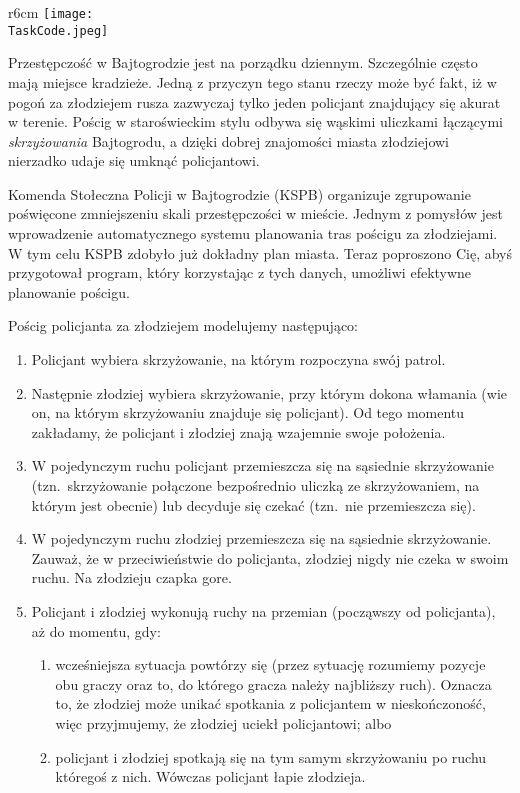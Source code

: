 \documentclass{boi2014-pl}
\renewcommand{\TaskCode}{coprobber}
\begin{document}
    \begin{wrapfigure}[8]{r}{6cm}
        \vspace{-24pt}
		\texttt{[image: \\TaskCode.jpeg]}
	\end{wrapfigure}

  \medskip
    Przestępczość w Bajtogrodzie jest na porządku dziennym.
    Szczególnie często mają miejsce kradzieże.
    Jedną z przyczyn tego stanu rzeczy może być fakt, iż w pogoń za złodziejem
    rusza zazwyczaj tylko jeden policjant znajdujący się akurat w terenie.
    Pościg w staroświeckim stylu odbywa się wąskimi uliczkami łączącymi
    \emph{skrzyżowania} Bajtogrodu, a dzięki dobrej znajomości miasta złodziejowi
    nierzadko udaje się umknąć policjantowi.

  \smallskip
    Komenda Stołeczna Policji w Bajtogrodzie (KSPB) organizuje zgrupowanie poświęcone
    zmniejszeniu skali przestępczości w mieście.
    Jednym z pomysłów jest wprowadzenie automatycznego systemu planowania tras pościgu
    za złodziejami.
    W tym celu KSPB zdobyło już dokładny plan miasta.
    Teraz poproszono Cię, abyś przygotował program, który korzystając z tych danych,
    umożliwi efektywne planowanie pościgu.

    Pościg policjanta za złodziejem modelujemy następująco:
    \begin{enumerate}
        \item Policjant wybiera skrzyżowanie, na którym rozpoczyna swój patrol.
        \item Następnie złodziej wybiera skrzyżowanie, przy którym dokona włamania
            (wie on, na którym skrzyżowaniu znajduje się policjant).
            Od tego momentu zakładamy, że policjant i złodziej znają wzajemnie
            swoje położenia.
        \item W pojedynczym ruchu policjant przemieszcza się na sąsiednie skrzyżowanie
            (tzn.\ skrzyżowanie połączone bezpośrednio uliczką ze skrzyżowaniem,
            na którym jest obecnie) lub decyduje się czekać (tzn.\ nie przemieszcza się).
        \item W pojedynczym ruchu złodziej przemieszcza się na sąsiednie skrzyżowanie.
            Zauważ, że w przeciwieństwie do policjanta, złodziej nigdy nie czeka
            w swoim ruchu.
            Na złodzieju czapka gore.
        \item Policjant i złodziej wykonują ruchy na przemian (począwszy od policjanta),
            aż do momentu, gdy:
        \begin{enumerate}
            \item wcześniejsza sytuacja powtórzy się (przez sytuację rozumiemy pozycje
                obu graczy oraz to, do którego gracza należy najbliższy ruch).
                Oznacza to, że złodziej może unikać spotkania z policjantem w nieskończoność,
                więc przyjmujemy, że złodziej uciekł policjantowi; albo
            \item policjant i złodziej spotkają się na tym samym skrzyżowaniu
                po ruchu któregoś z nich.
                Wówczas policjant łapie złodzieja.
        \end{enumerate}
    \end{enumerate}
\end{document}
